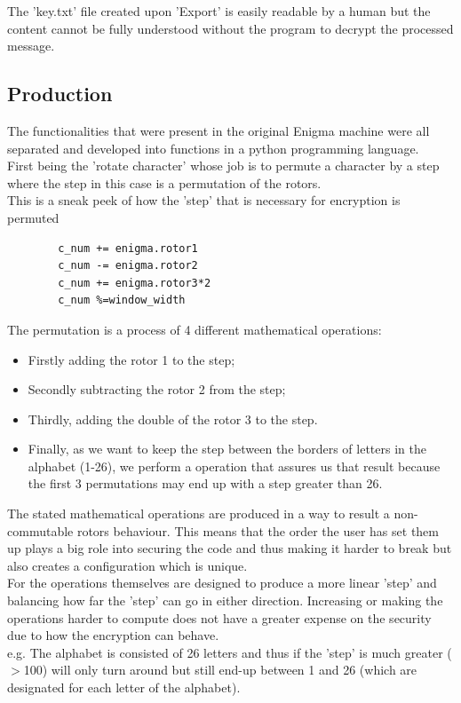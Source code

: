 \documentclass[conference,compsoc]{IEEEtran}
\begin{document}
The 'key.txt' file created upon 'Export' is easily readable by a human but the content cannot be fully understood without the program to decrypt the processed message.\\ 

\subsection{Production}

The functionalities that were present in the original Enigma machine were all separated and developed into functions in a python programming language.\\
First being the 'rotate character' whose job is to permute a character by a step where the step in this case is a permutation of the rotors.\\

This is a sneak peek of how the 'step' that is necessary for encryption is permuted
\begin{verbatim}
        c_num += enigma.rotor1
        c_num -= enigma.rotor2
        c_num += enigma.rotor3*2
        c_num %=window_width
\end{verbatim}
The permutation is a process of 4 different mathematical operations:\\
\begin{itemize}
    \item Firstly adding the rotor 1 to the step;\\
    \item Secondly subtracting the rotor 2 from the step;\\
    \item Thirdly, adding the double of the rotor 3 to the step.\\
    \newpage
    \item Finally, as we want to keep the step between the borders of letters in the alphabet (1-26), we perform a operation that assures us that result because the first 3 permutations may end up with a step greater than 26.\\
\end{itemize}

The stated mathematical operations are produced in a way to result a non-commutable rotors behaviour. This means that the order the user has set them up plays a big role into securing the code and thus making it harder to break but also creates a configuration which is unique.\\ 
For the operations themselves are designed to produce a more linear 'step' and balancing how far the 'step' can go in either direction. Increasing or making the operations harder to compute does not have a greater expense on the security due to how the encryption can behave.\\
e.g. The alphabet is consisted of 26 letters and thus if the 'step' is much greater ($>$100) will only turn around but still end-up between 1 and 26 (which are designated for each letter of the alphabet).\\
\end{document}
